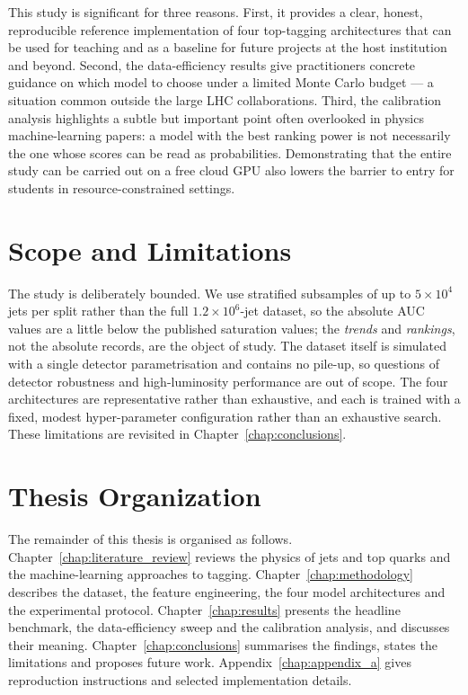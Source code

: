 This study is significant for three reasons. First, it provides a clear,
honest, reproducible reference implementation of four top-tagging
architectures that can be used for teaching and as a baseline for future
projects at the host institution and beyond. Second, the data-efficiency
results give practitioners concrete guidance on which model to choose under a
limited Monte Carlo budget --- a situation common outside the large LHC
collaborations. Third, the calibration analysis highlights a subtle but
important point often overlooked in physics machine-learning papers: a model
with the best ranking power is not necessarily the one whose scores can be
read as probabilities. Demonstrating that the entire study can be carried out
on a free cloud GPU also lowers the barrier to entry for students in
resource-constrained settings.

\section{Scope and Limitations}
\label{sec:scope}

The study is deliberately bounded. We use stratified subsamples of up to
$5\times10^{4}$ jets per split rather than the full $1.2\times10^{6}$-jet
dataset, so the absolute AUC values are a little below the published
saturation values; the \emph{trends} and \emph{rankings}, not the absolute
records, are the object of study. The dataset itself is simulated with a
single detector parametrisation and contains no pile-up, so questions of
detector robustness and high-luminosity performance are out of scope. The
four architectures are representative rather than exhaustive, and each is
trained with a fixed, modest hyper-parameter configuration rather than an
exhaustive search. These limitations are revisited in
Chapter~\ref{chap:conclusions}.

\section{Thesis Organization}
\label{sec:organization}

The remainder of this thesis is organised as follows.
Chapter~\ref{chap:literature_review} reviews the physics of jets and top
quarks and the machine-learning approaches to tagging.
Chapter~\ref{chap:methodology} describes the dataset, the feature
engineering, the four model architectures and the experimental protocol.
Chapter~\ref{chap:results} presents the headline benchmark, the
data-efficiency sweep and the calibration analysis, and discusses their
meaning. Chapter~\ref{chap:conclusions} summarises the findings, states the
limitations and proposes future work. Appendix~\ref{chap:appendix_a} gives
reproduction instructions and selected implementation details.
